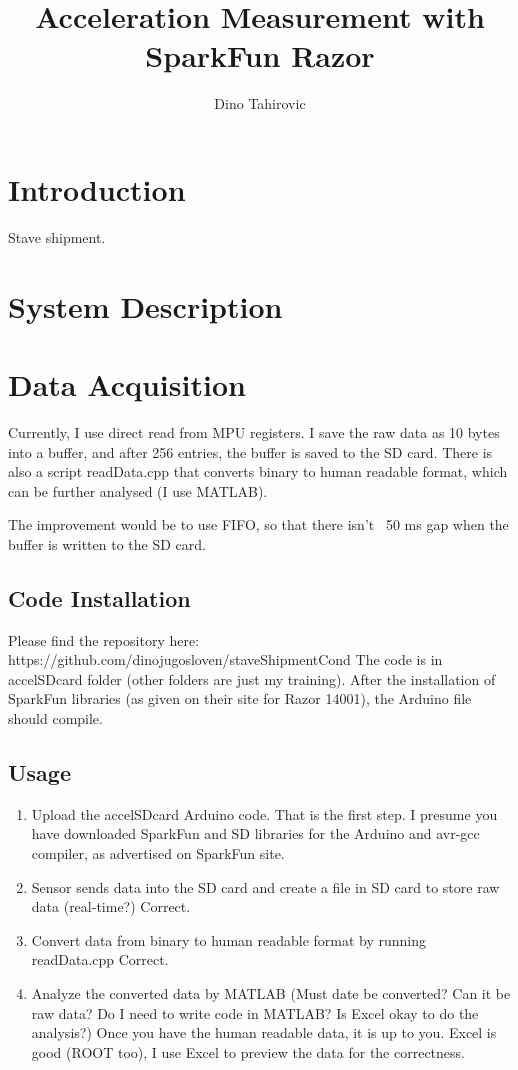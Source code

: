 \documentclass[]{article}
\title{Acceleration Measurement with SparkFun Razor}
\author{Dino Tahirovic}
\begin{document}
\maketitle

\begin{abstract}

\end{abstract}

\section{Introduction}
Stave shipment.

\section{System Description}

\section{Data Acquisition}
Currently, I use direct read from MPU registers. I save the raw data as 10 bytes into a buffer, and after 256 entries, the buffer is saved to the SD card. There is also a script readData.cpp that converts binary to human readable format, which can be further analysed (I use MATLAB).

The improvement would be to use FIFO, so that there isn’t ~50 ms gap when the buffer is written to the SD card.

\subsection{Code Installation}
Please find the repository here:
https://github.com/dinojugosloven/staveShipmentCond
The code is in accelSDcard folder (other folders are just my training). After the installation of SparkFun libraries (as given on their site for Razor 14001), the Arduino file should compile.

\subsection{Usage}

\begin{enumerate}
	\item Upload the accelSDcard Arduino code. That is the first step. I presume you have downloaded SparkFun and SD libraries for the Arduino and avr-gcc compiler, as advertised on SparkFun site.

 \item Sensor sends data into the SD card and create a file in SD card to store raw data (real-time?) Correct.

\item Convert data from binary to human readable format by running readData.cpp
Correct.

\item Analyze the converted data by MATLAB (Must date be converted? Can it be raw data? Do I need to write code in MATLAB? Is Excel okay to do the analysis?) Once you have the human readable data, it is up to you. Excel is good (ROOT too), I use Excel to preview the data for the correctness.
\end{enumerate}
\end{document}
